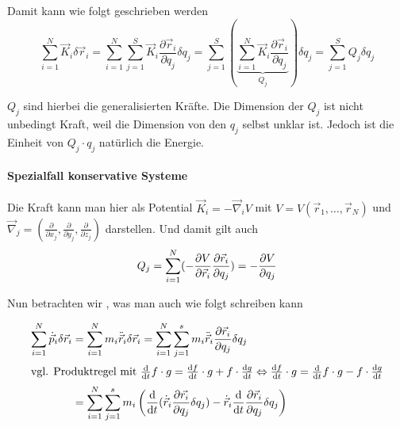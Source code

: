 Damit kann   wie folgt geschrieben werden
$$\sum_{i = 1}^N \vec{K}_i \delta \vec{r}_i 
= \sum_{i=1}^N \sum_{j = 1}^S \vec{K}_i \frac{\partial \vec{r}_i}{\partial q_j} \delta q_j
= \sum_{j=1}^S \left( \underbrace{\sum_{i = 1}^N \vec{K}_i \frac{\partial \vec{r}_i}{\partial q_j}}_{Q_j} \right) \delta q_j
= \sum_{j = 1}^S Q_j \delta q_j$$

$Q_j$ sind hierbei die generalisierten Kräfte. Die Dimension der $Q_j$ ist nicht unbedingt Kraft, weil die Dimension von den $q_j$ selbst unklar ist. Jedoch ist die Einheit von $Q_j \cdot q_j$ natürlich die Energie.

\paragraph{Spezialfall konservative Systeme}
Die Kraft kann man hier als Potential $\vec{K}_i = - \vec\nabla_i V$ mit $V = V(\vec{r}_1, \dots, \vec{r}_N)$ und $\vec{\nabla}_j = \left( \frac{\partial}{\partial x_j}, \frac{\partial}{\partial y_j}, \frac{\partial}{\partial z_j} \right)$ darstellen. Und damit gilt auch
$$Q_j = \sum_{i = 1}^N (- \frac{\partial V}{\partial \vec{r}_i} \frac{\partial \vec{r}_i}{\partial q_j}) = - \frac{\partial V}{\partial q_j}$$

Nun betrachten wir , was man auch wie folgt schreiben kann

\begin{align*}
\sum_{i = 1}^{N} \dot{\vec{p}}_i \delta \vec{r}_i 
&= \sum_{i = 1}^N m_i \ddot{\vec{r}}_i \delta \vec{r}_i 
= \sum_{i = 1}^N \sum_{j = 1}^s m_i \ddot{\vec{r}}_i  \frac{\partial \vec{r}_i}{\partial q_j} \delta q_j \\
\intertext{vgl. Produktregel mit $\frac{\mathrm d}{\mathrm d t} f \cdot g = \frac{\mathrm d f}{\mathrm d t} \cdot g + f \cdot \frac{\mathrm d g}{\mathrm d t} \Leftrightarrow \frac{\mathrm d f}{\mathrm d t} \cdot g = \frac{\mathrm d}{\mathrm d t} f \cdot g - f \cdot \frac{\mathrm d g}{\mathrm d t}$}
&= \sum_{i=1}^N \sum_{j=1}^s m_i \left(\frac{\mathrm d}{\mathrm d t} (\dot{\vec{r}}_i \frac{\partial \vec{r_i}}{\partial q_j} \delta q_j) -\dot{\vec{r}}_i \frac{\mathrm d}{\mathrm d t} \frac{\partial \vec{r}_i}{\partial q_j} \delta q_j \right)
\end{align*}

